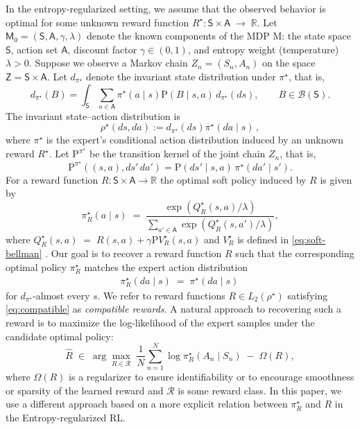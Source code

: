 \documentclass{article}
\theoremstyle{definition}
\theoremstyle{remark}
\theoremstyle{plain}
\def\Zset{\mathsf{Z}}
\newcommand{\MKQ}{\mathrm{P}}
\def\eqsp{\,}
\numberwithin{equation}{section}
\begin{document}
In the entropy-regularized setting, we assume that the observed behavior is optimal for some unknown reward function 
\(
R^\star: \mathsf{S} \times \mathsf{A} \;\rightarrow\; \mathbb{R}.
\)
Let 
\(
\mathsf{M}_0 = (\mathsf{S}, \mathsf{A}, \gamma, \lambda)
\)
denote the known components of the MDP $\mathrm{M}$: the state space $\mathsf{S}$, action set $\mathsf{A}$, discount factor $\gamma\in(0,1)$, and entropy weight (temperature) $\lambda>0$. Suppose we observe a Markov chain  
\(Z_n = 
(S_n,A_n)
\) on the space \(\Zset = \mathsf{S}\times\mathsf A\).
Let \(d_{\pi^\star}\) denote the invariant state distribution under
\(\pi^\star\), that is,
\[
    d_{\pi^\star}(B)
    =
    \int_{\mathsf S}
    \sum_{a\in\mathsf A}
    \pi^\star(a\mid s)\MKQ(B\mid s,a)\,
     d_{\pi^\star}(ds),
    \qquad
    B\in\mathcal B(\mathsf S).
\]
The invariant state--action distribution is
\[
    \rho^\star(ds,da)
    :=
    d_{\pi^\star}(ds)\pi^\star(da\mid s)\eqsp,
\]
where $\pi^\star$  is the expert's conditional action distribution induced by an unknown reward $R^\star$. Let $\MKQ^{\pi^\star}$ be the transition kernel of the joint chain $Z_n$,
 that is,
\[
    \MKQ^{\pi^\star}((s,a),ds'\,da')
    =
    \MKQ(ds'\mid s,a)\,\pi^\star(da'\mid s').
\] For a reward function $
R: \mathsf{S}\times\mathsf{A} \to \mathbb{R}$ the optimal soft policy induced by $R$ is given by
\[
\pi_R^\star(a\mid s)
\;=\;
\frac{\exp\!\left(Q_R^\star(s,a)/\lambda\right)}
{\sum_{a'\in\mathsf{A}} \exp\!\left(Q_R^\star(s,a')/\lambda\right)},
\]
where $Q_R^\star(s,a) \;=\; R(s,a) + \gamma \MKQ V_R^\star(s,a)$ and $V_R^\star$ is defined in \eqref{eq:soft-bellman} .
Our goal is to recover a reward function \(R\) such that the corresponding optimal policy
\(\pi^\star_R\) matches the expert action distribution 
\begin{align}
\label{eq:compatible}
\pi^\star_R(da\mid s) \;=\; \pi^\star(da\mid s)\eqsp
\end{align}
for \(d_{\pi^\star}\)-almost every \(s\).
We refer to reward functions \(R\in L_2(\rho^\star)\) satisfying
\eqref{eq:compatible} as \emph{compatible rewards}. A natural approach to
recovering such a reward is to maximize the log-likelihood of the expert
samples under the candidate optimal policy:
\[
\hat{R}
\;\in\;
\arg\max_{R \in \mathcal{R}}
\;
\frac{1}{N} \sum_{n=1}^N 
\log \pi^\star_R(A_n \mid S_n)
\;-\;
\Omega(R),
\]
where $\Omega(R)$ is a regularizer to ensure identifiability or to encourage smoothness or sparsity of the learned reward and $\mathcal R$ is some reward class. In this paper, we use a different approach based on a more explicit relation between \(\pi^\star_R\) and \(R\) in the Entropy-regularized RL.
\end{document}
